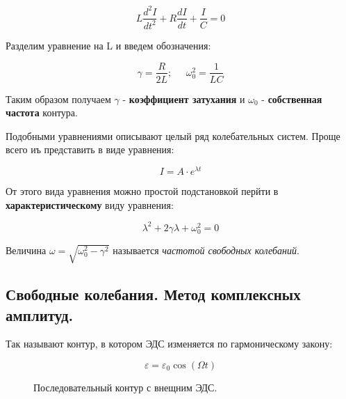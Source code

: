 \documentclass[a4paper,12pt]{article} %
\begin{document}
\begin{equation}\label{2.6}
L \frac{d^2 I}{dt^2} + R \frac{dI}{dt} + \frac{I}{C} = 0
\end{equation}

Разделим уравнение на L и введем обозначения:

\begin{equation}\label{2.7}
\gamma = \frac{R}{2L}; \;\;\;\;\;  \omega^2_0 = \frac{1}{LC}
\end{equation}

Таким образом получаем $\gamma$ - \textbf{коэффициент затухания} и $\omega_0$ - \textbf{собственная частота} контура.

Подобными уравнениями описывают целый ряд колебательных систем. Проще всего иъ представить в виде уравнения:

\begin{equation}\label{2.9}
I = A \cdot e^{\lambda t}
\end{equation}

От этого вида уравнения можно простой подстановкой перйти в \textbf{характеристическому} виду уравнения:

\begin{equation}\label{2.10}
\lambda^2 + 2\gamma \lambda + \omega^2_0 = 0
\end{equation}

Величина $\omega = \sqrt{\omega^2_0 - \gamma^2}$ называется \textit{частотой свободных колебаний}.

\subsection{Свободные колебания. Метод комплексных амплитуд.}

Так называют контур, в котором ЭДС изменяется по гармоническому закону:

\begin{equation}\label{2.00}
\varepsilon = \varepsilon_0 \cos(\Omega t)
\end{equation}

\begin{figure}[H]
\noindent{}
\caption{Последовательный контур с внещним ЭДС.}
\label{pic0:ref}
\end{figure}
\end{document}

